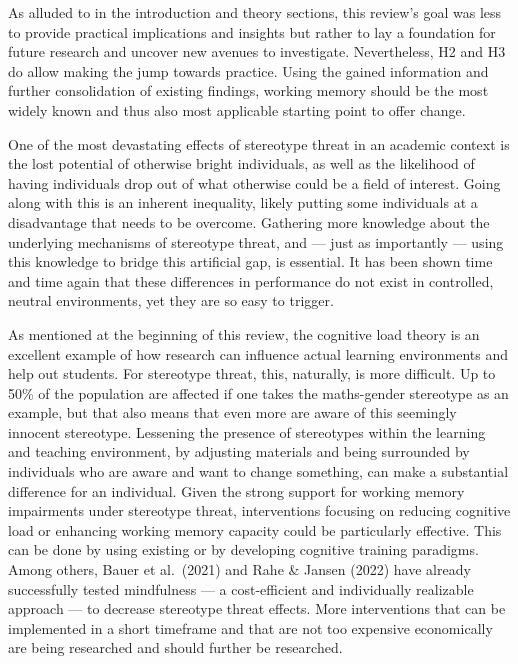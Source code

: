\documentclass[
  stu, a4paper,floatsintext]{apa7}
\begin{document}
As alluded to in the introduction and theory sections, this review's goal was less to provide practical implications and insights but rather to lay a foundation for future research and uncover new avenues to investigate. Nevertheless, H2 and H3 do allow making the jump towards practice. Using the gained information and further consolidation of existing findings, working memory should be the most widely known and thus also most applicable starting point to offer change.

One of the most devastating effects of stereotype threat in an academic context is the lost potential of otherwise bright individuals, as well as the likelihood of having individuals drop out of what otherwise could be a field of interest. Going along with this is an inherent inequality, likely putting some individuals at a disadvantage that needs to be overcome. Gathering more knowledge about the underlying mechanisms of stereotype threat, and --- just as importantly --- using this knowledge to bridge this artificial gap, is essential. It has been shown time and time again that these differences in performance do not exist in controlled, neutral environments, yet they are so easy to trigger.

As mentioned at the beginning of this review, the cognitive load theory is an excellent example of how research can influence actual learning environments and help out students. For stereotype threat, this, naturally, is more difficult. Up to 50\% of the population are affected if one takes the maths-gender stereotype as an example, but that also means that even more are aware of this seemingly innocent stereotype. Lessening the presence of stereotypes within the learning and teaching environment, by adjusting materials and being surrounded by individuals who are aware and want to change something, can make a substantial difference for an individual. Given the strong support for working memory impairments under stereotype threat, interventions focusing on reducing cognitive load or enhancing working memory capacity could be particularly effective. This can be done by using existing or by developing cognitive training paradigms. Among others, Bauer et al.~(2021) and Rahe \& Jansen (2022) have already successfully tested mindfulness --- a cost-efficient and individually realizable approach --- to decrease stereotype threat effects. More interventions that can be implemented in a short timeframe and that are not too expensive economically are being researched and should further be researched.
\end{document}
